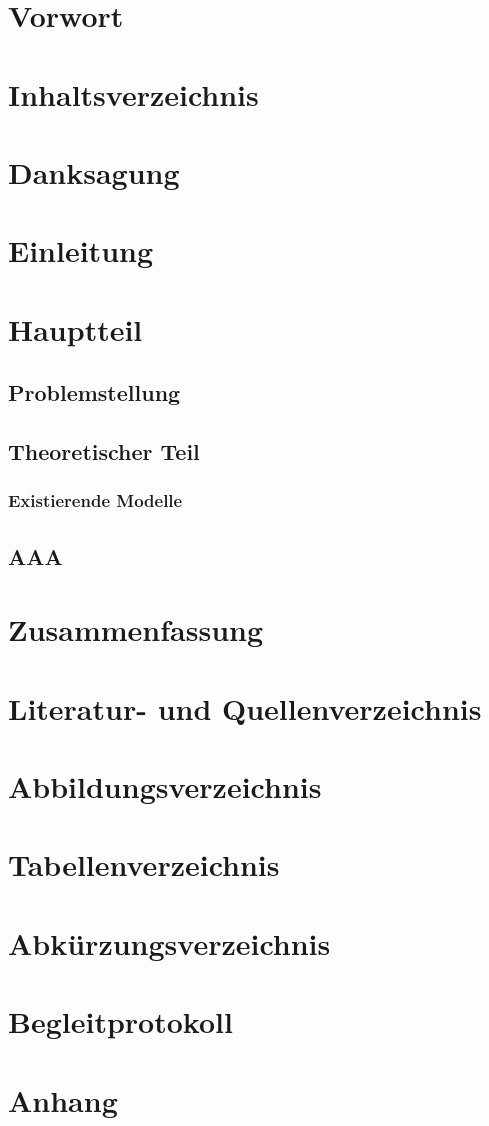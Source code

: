 \documentclass[a4paper]{article}
\begin{document}
\section{Vorwort}

\section{Inhaltsverzeichnis}
\tableofcontents

\section{Danksagung}

\section{Einleitung}

\section{Hauptteil}

\subsection{Problemstellung}

\subsection{Theoretischer Teil}

\subsubsection{Existierende Modelle}

\subsection{AAA}

\section{Zusammenfassung}

\section{Literatur- und Quellenverzeichnis}

\section{Abbildungsverzeichnis}

\section{Tabellenverzeichnis}

\section{Abkürzungsverzeichnis}

\section{Begleitprotokoll}

\section{Anhang}
\end{document}
